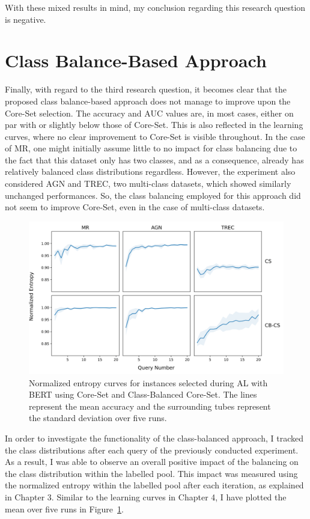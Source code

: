 \documentclass[english,bachelor,ul]{webisthesis} %
\begin{document}
With these mixed results in mind, my conclusion regarding this research question is negative.

\section{Class Balance-Based Approach}

Finally, with regard to the third research question, it becomes clear that the proposed class balance-based approach does not manage to improve upon the Core-Set selection. The accuracy and AUC values are, in most cases, either on par with or slightly below those of Core-Set. This is also reflected in the learning curves, where no clear improvement to Core-Set is visible throughout. In the case of MR, one might initially assume little to no impact for class balancing due to the fact that this dataset only has two classes, and as a consequence, already has relatively balanced class distributions regardless. However, the experiment also considered AGN and TREC, two multi-class datasets, which showed similarly unchanged performances. So, the class balancing employed for this approach did not seem to improve Core-Set, even in the case of multi-class datasets.  

\begin{figure}[htbp]
    \centering
    \includegraphics[scale=0.5]{img/entropy_plots_new-1.png}
    \caption{Normalized entropy curves for instances selected during AL with BERT using Core-Set and Class-Balanced Core-Set. The lines represent the mean accuracy and the surrounding tubes represent the standard deviation over five runs.}
    \label{fig:entropy-plot}
\end{figure}

In order to investigate the functionality of the class-balanced approach, I tracked the class distributions after each query of the previously conducted experiment. As a result, I was able to observe an overall positive impact of the balancing on the class distribution within the labelled pool. This impact was measured using the normalized entropy within the labelled pool after each iteration, as explained in Chapter 3. Similar to the learning curves in Chapter 4, I have plotted the mean over five runs in Figure~\ref{fig:entropy-plot}. 
\end{document}
